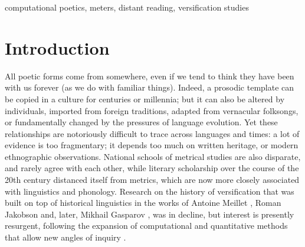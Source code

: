 \documentclass[
    hf
]{ceurart}
\begin{document}
\begin{keywords}
    computational poetics, meters, distant reading, versification studies
\end{keywords}

\maketitle

\section{Introduction}

All poetic forms come from somewhere, even if we tend to think they have been with us forever (as we do with familiar things). Indeed, a prosodic template can be copied in a culture for centuries or millennia; but it can also be altered by individuals, imported from foreign traditions, adapted from vernacular folksongs, or fundamentally changed by the pressures of language evolution. Yet these relationships are notoriously difficult to trace across languages and times: a lot of evidence is too fragmentary; it depends too much on written heritage, or modern ethnographic observations. National schools of metrical studies are also disparate, and rarely agree with each other, while literary scholarship over the course of the 20th century distanced itself from metrics, which are now more closely associated with linguistics and phonology. Research on the history of versification that was built on top of historical linguistics in the works of Antoine Meillet \cite{meillet_origines_1923}, Roman Jakobson \cite{jakobson_zur_1929} and, later, Mikhail Gasparov \cite{gasparov_history_1996}, was in decline, but interest is presently resurgent, following the expansion of computational and quantitative methods that allow new angles of inquiry \cite{polilova_spanish_2018, sela_semantics_2022,de_sisto_development_2023}.
\end{document}
